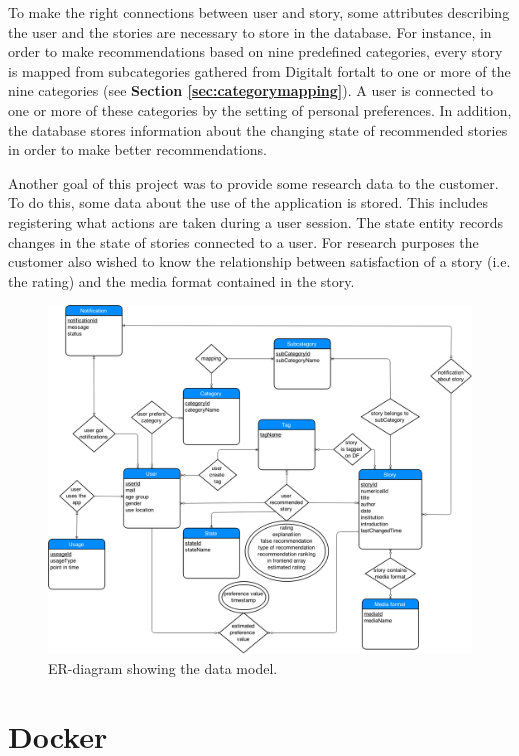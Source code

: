 To make the right connections between user and story, some attributes describing the user and the stories are necessary to store in the database. For instance, in order to make recommendations based on nine predefined categories, every story is mapped from subcategories gathered from Digitalt fortalt to one or more of the nine categories (see \textbf{Section \ref{sec:categorymapping}}). A user is connected to one or more of these categories by the setting of personal preferences. In addition, the database stores information about the changing state of recommended stories in order to make better recommendations. \newline

Another goal of this project was to provide some research data to the customer. To do this, some data about the use of the application is stored. This includes registering what actions are taken during a user session. The state entity records changes in the state of stories connected to a user. For research purposes the customer also wished to know the relationship between satisfaction of a story (i.e. the rating) and the media format contained in the story.

\begin{figure}[h!]
	\centering
	\includegraphics[width=\textwidth]{fig/er_diagram}
	\caption{ER-diagram showing the data model.}
	\label{Fig:er_diagram}
\end{figure}


\section{Docker}
\label{subsec:docker}

